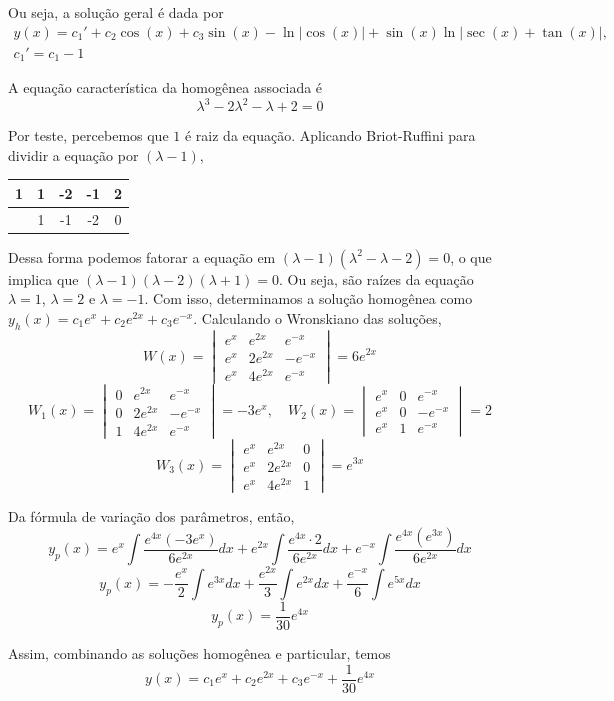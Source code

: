 \documentclass[oneside,12pt,a4paper]{report}
\begin{document}
\begin{resolucao}
    Ou seja, a solução geral é dada por
    \begin{gather*}
        \boxed{y(x)=c_1'+c_2\cos(x)+c_3\sin(x)-\ln|\cos(x)|+\sin(x)\ln|\sec(x)+\tan(x)|},\\
        c_1'=c_1-1
    \end{gather*}

    \itemresolucao A equação característica da homogênea associada é 
    \[\lambda^3-2\lambda^2-\lambda+2=0\]
    
    Por teste, percebemos que $1$ é raiz da equação. Aplicando Briot-Ruffini para dividir a equação por $(\lambda-1)$,

    \begin{table}[H]
        \centering
        \begin{tabular}{c|cccc}
            1 & 1 & -2 & -1 & 2\\
            \hline
              & 1 & -1 & -2 & 0
        \end{tabular}
    \end{table}

    Dessa forma podemos fatorar a equação em $(\lambda-1)(\lambda^2-\lambda-2)=0$, o que implica que $(\lambda-1)(\lambda-2)(\lambda+1)=0$. Ou seja, são raízes da equação $\lambda=1$, $\lambda=2$ e $\lambda=-1$. Com isso, determinamos a solução homogênea como $y_h(x)=c_1e^x+c_2e^{2x}+c_3e^{-x}$. Calculando o Wronskiano das soluções,
    \[W(x)=\begin{vmatrix}
        e^x & e^{2x} & e^{-x}\\
        e^x & 2e^{2x} & -e^{-x}\\
        e^x & 4e^{2x} & e^{-x}
    \end{vmatrix}=6e^{2x}\]
    \[W_1(x)=\begin{vmatrix}
        0 & e^{2x} & e^{-x}\\
        0 & 2e^{2x} & -e^{-x}\\
        1 & 4e^{2x} & e^{-x}
    \end{vmatrix}=-3e^x, 
    \quad W_2(x)=\begin{vmatrix}
        e^x & 0 & e^{-x}\\
        e^x & 0 & -e^{-x}\\
        e^x & 1 & e^{-x}
    \end{vmatrix}=2\]
    \[W_3(x)=\begin{vmatrix}
        e^x & e^{2x} &  0\\
        e^x & 2e^{2x} & 0\\
        e^x & 4e^{2x} & 1
    \end{vmatrix}=e^{3x}\]

    Da fórmula de variação dos parâmetros, então,
    \[y_p(x)=e^x\int\frac{e^{4x}(-3e^x)}{6e^{2x}}dx+e^{2x}\int\frac{e^{4x}\cdot2}{6e^{2x}}dx+e^{-x}\int\frac{e^{4x}(e^{3x})}{6e^{2x}}dx\]
    \[y_p(x)=-\frac{e^x}{2}\int e^{3x}dx+\frac{e^{2x}}{3}\int e^{2x}dx+\frac{e^{-x}}{6}\int e^{5x}dx\]
    \[y_p(x)=\frac{1}{30}e^{4x}\]

    Assim, combinando as soluções homogênea e particular, temos
    \[\boxed{y(x)=c_1e^x+c_2e^{2x}+c_3e^{-x}+\frac{1}{30}e^{4x}}\]

\end{resolucao}
\end{document}
